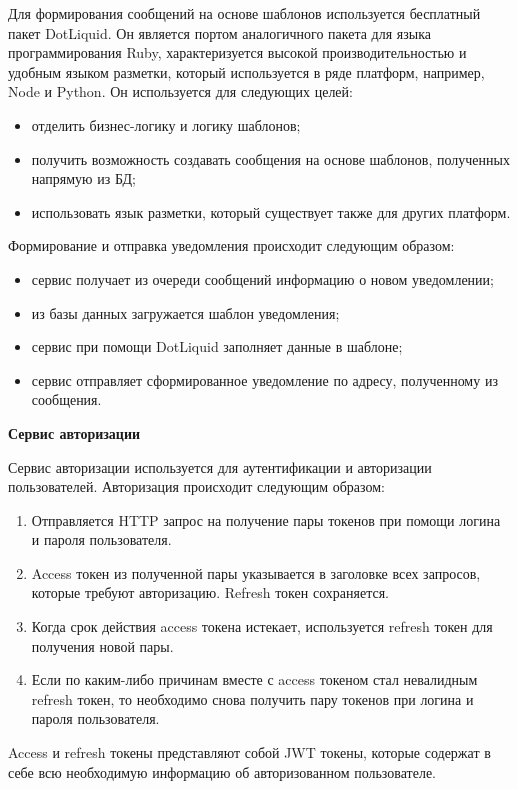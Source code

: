 Для формирования сообщений на основе шаблонов используется бесплатный пакет DotLiquid. Он является портом аналогичного пакета для языка программирования Ruby, характеризуется высокой производительностью и удобным языком разметки, который используется в ряде платформ, например, Node и Python. Он используется для следующих целей:
\begin{itemize}
    \item отделить бизнес-логику и логику шаблонов;
    \item получить возможность создавать сообщения на основе шаблонов, полученных напрямую из БД;
    \item использовать язык разметки, который существует также для других платформ.
\end{itemize}

Формирование и отправка уведомления происходит следующим образом:
\begin{itemize}
    \item сервис получает из очереди сообщений информацию о новом уведомлении;
    \item из базы данных загружается шаблон уведомления;
    \item сервис при помощи DotLiquid заполняет данные в шаблоне;
    \item сервис отправляет сформированное уведомление по адресу, полученному из сообщения.
\end{itemize}

\bigskip
\textbf{Сервис авторизации}

Сервис авторизации используется для аутентификации и авторизации пользователей. Авторизация происходит следующим образом:

\begin{enumerate}
    \item Отправляется HTTP запрос на получение пары токенов при помощи логина и пароля пользователя.
    \item Access токен из полученной пары указывается в заголовке всех запросов, которые требуют авторизацию. Refresh токен сохраняется.
    \item Когда срок действия access токена истекает, используется refresh токен для получения новой пары.
    \item Если по каким-либо причинам вместе с access токеном стал невалидным refresh токен, то необходимо снова получить пару токенов при логина и пароля пользователя.
\end{enumerate}

Access и refresh токены представляют собой JWT токены, которые содержат в себе всю необходимую информацию об авторизованном пользователе.


